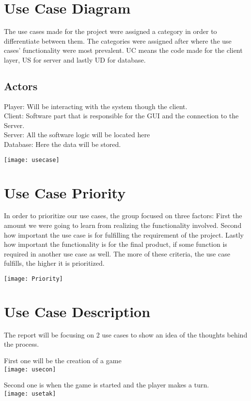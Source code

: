 \section{Use Case Diagram}

The use cases made for the project were assigned a category in order to
 differentiate between them. The categories were assigned after where the
  use cases’ functionality were most prevalent. UC means the code made for
   the client layer, US for server and lastly UD for database.

\subsection{Actors}

Player: Will be interacting with the system though the client.\\
Client: Software part that is responsible for the GUI and the connection
 to the Server. \\
Server: All the software logic will be located here\\
Database: Here the data will be stored.

\texttt{[image: usecase]}

\section{Use Case Priority}

In order to prioritize our use cases, the group focused on three factors:
 First the amount we were going to learn from realizing the functionality
  involved. Second how important the use case is for fulfilling the
   requirement of the project. Lastly how important the functionality
    is for the final product, if some function is required in another
     use case as well. The more of these criteria, the use case fulfills,
      the higher it is prioritized.

\texttt{[image: Priority]}

\section{Use Case Description}

The report will be focusing on 2 use cases to show an idea of the thoughts
 behind the process.\clearpage

First one will be the creation of a game\\

\texttt{[image: usecon]}
\clearpage

Second one is when the game is started and the player makes a turn.\\

\texttt{[image: usetak]}
